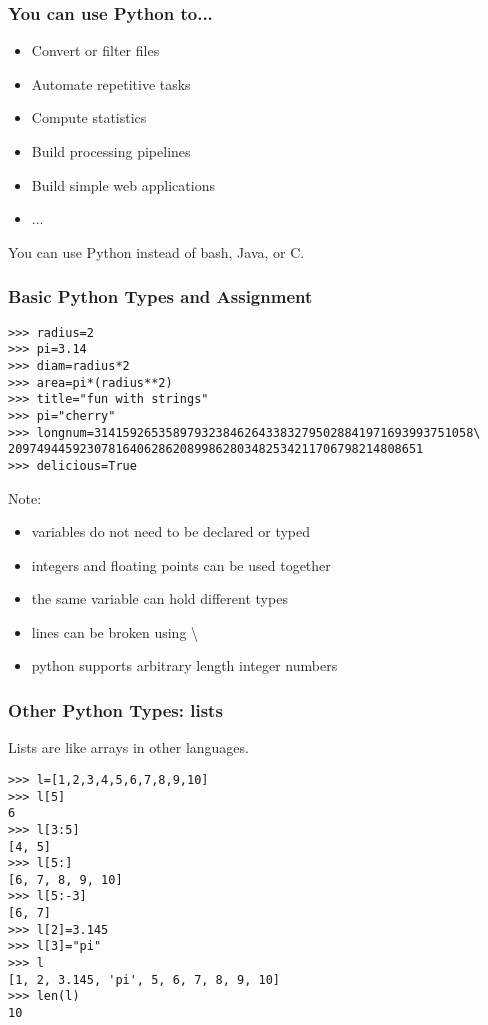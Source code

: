 \documentclass[10pt]{beamer}
\begin{document}
\begin{frame}
\frametitle{You can use Python to...}
\begin{itemize}
\item Convert or filter files
\item Automate repetitive tasks
\item Compute statistics
\item Build processing pipelines
\item Build simple web applications
\item ...
\end{itemize}

You can use Python instead of bash, Java, or C. 
\end{frame}

\begin{frame}[fragile]
\frametitle{Basic Python Types and Assignment}

\begin{verbatim}
>>> radius=2
>>> pi=3.14
>>> diam=radius*2
>>> area=pi*(radius**2)
>>> title="fun with strings"
>>> pi="cherry"
>>> longnum=31415926535897932384626433832795028841971693993751058\
2097494459230781640628620899862803482534211706798214808651
>>> delicious=True
\end{verbatim}

Note:
\begin{itemize}
\item variables do not need to be declared or typed
\item integers and floating points can be used together
\item the same variable can hold different types
\item lines can be broken using \textbackslash
\item python supports arbitrary length integer numbers
\end{itemize}
\end{frame}

\begin{frame}[fragile]
\frametitle{Other Python Types: lists}

Lists are like arrays in other languages.  
\begin{verbatim}
>>> l=[1,2,3,4,5,6,7,8,9,10]
>>> l[5]
6
>>> l[3:5]
[4, 5]
>>> l[5:]
[6, 7, 8, 9, 10]
>>> l[5:-3]
[6, 7]
>>> l[2]=3.145
>>> l[3]="pi"
>>> l
[1, 2, 3.145, 'pi', 5, 6, 7, 8, 9, 10]
>>> len(l)
10
\end{verbatim}

\end{frame}
\end{document}
